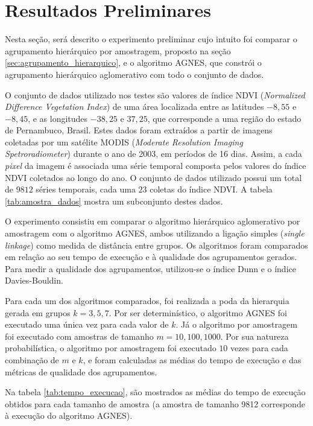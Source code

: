 \section{Resultados Preliminares}
	\label{sec:resultados_preliminares}

Nesta seção, será descrito o experimento preliminar cujo intuito foi comparar
o agrupamento hierárquico por amostragem, proposto na seção
\ref{sec:agrupamento_hierarquico}, e o algoritmo AGNES, que constrói o
agrupamento hierárquico aglomerativo com todo o conjunto de dados.

O conjunto de dados utilizado nos testes são valores de índice NDVI
(\emph{Normalized Difference Vegetation Index}) de uma área localizada entre
as latitudes $-8,55$ e $-8,45$, e as longitudes $-38,25$ e $37,25$, que 
corresponde a uma região do estado de Pernambuco, Brasil. Estes dados foram
extraídos a partir de imagens coletadas por um satélite MODIS
(\emph{Moderate Resolution Imaging Spetroradiometer}) durante o ano de 2003,
em períodos de 16 dias. Assim, a cada \emph{pixel} da imagem é associada uma
série temporal composta pelos valores do índice NDVI coletados ao longo do ano.
O conjunto de dados utilizado possui um total de $9812$ séries temporais, cada
uma $23$ coletas do índice NDVI. A tabela \ref{tab:amostra_dados} mostra um
subconjunto destes dados.



O experimento consistiu em comparar o algoritmo hierárquico aglomerativo por
amostragem com o algoritmo AGNES, ambos utilizando a ligação simples
(\emph{single linkage}) como medida de distância entre grupos. Os algoritmos
foram comparados em relação ao seu tempo de execução e à qualidade dos
agrupamentos gerados. Para medir a qualidade dos agrupamentos, utilizou-se
o índice Dunn e o índice Davies-Bouldin.

Para cada um dos algoritmos comparados, foi realizada a poda da hierarquia
gerada em grupos $k = 3,5,7$. Por ser determinístico, o algoritmo AGNES foi
executado uma única vez para cada valor de $k$. Já o algoritmo por amostragem
foi executado com amostras de tamanho $m = 10,100,1000$. Por sua natureza 
probabilística, o algoritmo por amostragem foi executado $10$ vezes para cada
combinação de $m$ e $k$, e foram calculadas as médias do tempo de execução
e das métricas de qualidade dos agrupamentos. 

Na tabela \ref{tab:tempo_execucao}, são mostrados as médias do tempo de execução
obtidos para cada tamanho de amostra (a amostra de tamanho 9812 corresponde
à execução do algoritmo AGNES).

